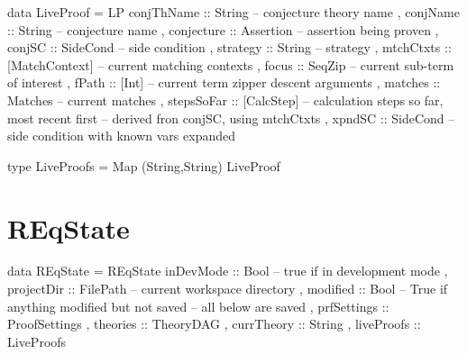 \begin{code}
data LiveProof
  = LP {
      conjThName :: String -- conjecture theory name
    , conjName :: String -- conjecture name
    , conjecture :: Assertion -- assertion being proven
    , conjSC :: SideCond -- side condition
    , strategy :: String -- strategy
    , mtchCtxts :: [MatchContext] -- current matching contexts
    , focus :: SeqZip  -- current sub-term of interest
    , fPath :: [Int] -- current term zipper descent arguments
    , matches :: Matches -- current matches
    , stepsSoFar :: [CalcStep]  -- calculation steps so far, most recent first
    -- derived fron conjSC, using mtchCtxts
    , xpndSC :: SideCond -- side condition with known vars expanded
    }

type LiveProofs = Map (String,String) LiveProof
\end{code}

\newpage
\section{REqState}

\begin{code}
data REqState
 = REqState {
      inDevMode   ::  Bool -- true if in development mode
    , projectDir  ::  FilePath -- current workspace directory
    , modified    ::  Bool -- True if anything modified but not saved
    -- all below are saved
    , prfSettings ::  ProofSettings
    , theories    ::  TheoryDAG
    , currTheory  ::  String
    , liveProofs  ::  LiveProofs
    }
\end{code}



